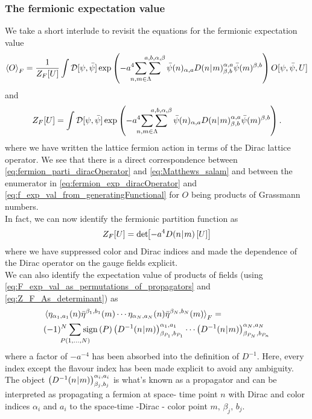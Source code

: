 \documentclass[a4paper,10pt]{article}
\begin{document}
\subsubsection{The fermionic expectation value}
We take a short interlude to revisit the equations for the fermionic expectation value
\begin{equation}\label{eq:fermion_exp_diracOperator}
\braket{O}_{F}=\frac{1}{Z_{F}[U]} \int \mathcal{D}[\psi, \bar{\psi}] \exp\left( -a^4\mkern-18mu \,\,\sum\limits_{n,m\in\Lambda}\mkern-18mu\sum\limits^{a,b,\alpha,\beta} \bar{\psi}(n)_{\alpha,a}D(n\mkern-4mu\mid \mkern-4mu m)_{\beta,b}^{\alpha,a} \bar{\psi}(m)^{\beta,b}\right) O[\psi, \bar{\psi}, U]
\end{equation}
and
\begin{equation}\label{eq:fermion_parti_diracOperator}
Z_{F}[U]=\int \mathcal{D}[\psi, \bar{\psi}] \exp\left( -a^4\mkern-18mu \,\,\sum\limits_{n,m\in\Lambda}\mkern-18mu\sum\limits^{a,b,\alpha,\beta} \bar{\psi}(n)_{\alpha,a}D(n\mkern-4mu\mid \mkern-4mu m)_{\beta,b}^{\alpha,a} \bar{\psi}(m)^{\beta,b}\right).
\end{equation}
where we have written the lattice fermion action in terms of the Dirac lattice operator. We see that there is a direct correspondence between \eqref{eq:fermion_parti_diracOperator} and \eqref{eq:Matthews_salam} and between the enumerator in \eqref{eq:fermion_exp_diracOperator} and \eqref{eq:f_exp_val_from_generatingFunctional} for $O$ being products of Grassmann numbers.\\In fact, we can now identify the fermionic partition function as
\begin{equation}\label{eq:Z_F_As_determinant}
Z_{F}[U] = \operatorname{det}\mkern-5mu\left[ -a^4D(n\mkern-4mu\mid \mkern-4mu m)\left[ U \right] \right]
\end{equation}
where we have suppressed color and Dirac indices and made the dependence of the Dirac operator on the gauge fields explicit.\\We can also identify the expectation value of products of fields (using \eqref{eq:F_exp_val_as_permutations_of_propagators} and \eqref{eq:Z_F_As_determinant}) as
\begin{equation}\label{eq:fermion_exp_val_Wick}
\begin{aligned}
&\braket{\eta_{\alpha_1,a_1}(n)\bar{\eta}^{\beta_1,b_1}(m)\cdots\eta_{\alpha_N,a_N}(n)\bar{\eta}^{\beta_N,b_N}(m)}_F = \\&(-1)^N \mkern-18mu\sum\limits_{P(1,\ldots,N)}\mkern-18mu\operatorname{sign}\left( P \right)\left( D^{-1}(n\mkern-4mu\mid \mkern-4mu m) \right)_{\beta_{P_1},b_{P_1}}^{\alpha_1,a_1}\cdots\left( D^{-1}(n\mkern-4mu\mid \mkern-4mu m) \right)_{\beta_{P_N},b_{P_n}}^{\alpha_N,a_N}
\end{aligned}
\end{equation}
where a factor of $-a^{-4}$ has been absorbed into the definition of $D^{-1}$. Here, every index except the flavour index has been made explicit to avoid any ambiguity. The object $\left( D^{-1}(n\mkern-4mu\mid \mkern-4mu m) \right)_{\beta_{j},b_{j}}^{\alpha_i,a_i}$ is what's known as a propagator and can be interpreted as propagating a fermion at space- time point $n$ with Dirac and color indices $\alpha_i$ and $a_i$ to the space-time -Dirac - color point $m,\,\beta_j,\,b_j$.
\end{document}
